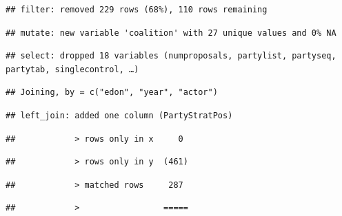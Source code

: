 \documentclass[]{article}
\newenvironment{Shaded}{\begin{snugshade}}{\end{snugshade}}
\newcommand{\DataTypeTok}[1]{\textcolor[rgb]{0.13,0.29,0.53}{#1}}
\newcommand{\KeywordTok}[1]{\textcolor[rgb]{0.13,0.29,0.53}{\textbf{#1}}}
\newcommand{\NormalTok}[1]{#1}
\newcommand{\OperatorTok}[1]{\textcolor[rgb]{0.81,0.36,0.00}{\textbf{#1}}}
\newcommand{\StringTok}[1]{\textcolor[rgb]{0.31,0.60,0.02}{#1}}
\begin{document}
\begin{verbatim}
## filter: removed 229 rows (68%), 110 rows remaining
\end{verbatim}

\begin{verbatim}
## mutate: new variable 'coalition' with 27 unique values and 0% NA
\end{verbatim}

\begin{Shaded}
\end{Shaded}

\begin{verbatim}
## select: dropped 18 variables (numproposals, partylist, partyseq, partytab, singlecontrol, …)
\end{verbatim}

\begin{verbatim}
## Joining, by = c("edon", "year", "actor")
\end{verbatim}

\begin{verbatim}
## left_join: added one column (PartyStratPos)
\end{verbatim}

\begin{verbatim}
##            > rows only in x     0
\end{verbatim}

\begin{verbatim}
##            > rows only in y  (461)
\end{verbatim}

\begin{verbatim}
##            > matched rows     287
\end{verbatim}

\begin{verbatim}
##            >                 =====
\end{verbatim}
\end{document}
